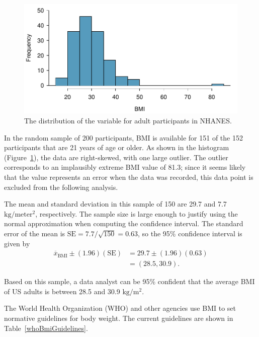\begin{spacing}{1.5}
\begin{example}
	\begin{figure}[h]
		\centering
		\includegraphics[width=\textwidth]
		{ch_inference_foundations_oi_biostat/figures/nhanesAdultBmiHist/nhanesAdultBmiHist}
		\caption{The distribution of the variable  for adult participants in NHANES.}
		\label{nhanesAdultBmiHist}
	\end{figure}
	
	In the random sample of 200 participants, BMI is available for 151 of the 152 participants that are 21 years of age or older. As shown in the histogram (Figure~\ref{nhanesAdultBmiHist}), the data are right-skewed, with one large outlier. The outlier corresponds to an implausibly extreme BMI value of 81.3; since it seems likely that the value represents an error when the data was recorded, this data point is excluded from the following analysis. 
	
	The mean and standard deviation in this sample of 150 are 29.7 and 7.7 $\text{kg}/\text{meter}{^2}$, respectively.  The sample size is large enough to justify using the normal approximation when computing the confidence interval.  The standard error of the mean is $\text{SE} = 7.7/\sqrt{150} = 0.63$, so the 95\% confidence interval is given by 
	\begin{align*}
	\overline{x}_{\text{BMI}} \pm (1.96)(\text{SE}) &= 29.7 \pm (1.96)(0.63) \\
	&= (28.5, 30.9).
	\end{align*}	
	
	Based on this sample, a data analyst can be 95\% confident that the average BMI of US adults is between 28.5 and 30.9 $\text{kg}/\text{m}{^2}$.
\end{example}

The World Health Organization (WHO) and other agencies use BMI to set normative guidelines for body weight. The current guidelines are shown in Table~\ref{whoBmiGuidelines}. 


\end{spacing}
